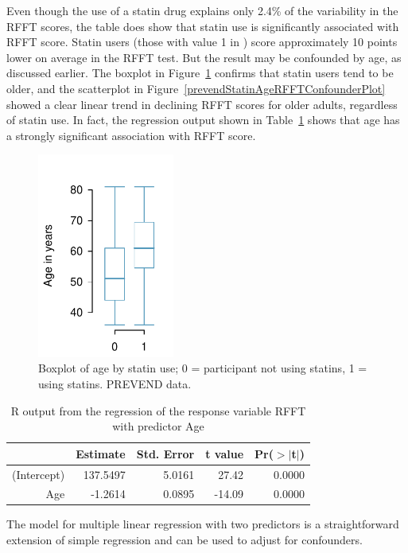 Even though the use of a statin drug explains only 2.4\% of the variability in the RFFT scores, the table does show that statin use is significantly associated with RFFT score. Statin users (those with value 1 in ) score approximately 10 points lower on average in the RFFT test.  But the result may be confounded by age, as discussed earlier.   The boxplot in Figure~\ref{prevendStatinAgeBoxPlot} confirms that statin users tend to be older, and the scatterplot in Figure~\ref{prevendStatinAgeRFFTConfounderPlot} showed a clear linear trend in declining RFFT scores for older adults, regardless of statin use.  In fact, the regression output shown in Table~\ref{prevendRFFTAgeRegression} shows that age has a strongly significant association with RFFT score.
 
 \begin{figure}[h!]
 	\centering
 	\includegraphics[width=0.4\textwidth]
	{ch_multiple_linear_regression_oi_biostat/figures/prevendStatinAgeBoxPlot/prevendStatinAgeBoxPlot.pdf}
 	\caption{Boxplot of age by statin use; 0 = participant not using statins, 1 = using statins. PREVEND data.}
	\label{prevendStatinAgeBoxPlot}
 \end{figure}
 
\begin{table}[ht]
\centering
\begin{tabular}{rrrrr}
  \hline
 & Estimate & Std. Error & t value & Pr($>$$|$t$|$) \\ 
  \hline
(Intercept) & 137.5497 & 5.0161 & 27.42 & 0.0000 \\ 
  Age & -1.2614 & 0.0895 & -14.09 & 0.0000 \\ 
   \hline
\end{tabular}
\caption{R output from the regression of the 
       response variable RFFT with predictor Age} 
\label{prevendRFFTAgeRegression}
\end{table}
The model for multiple linear regression with two predictors is a straightforward extension of simple regression and can be used to adjust for confounders.  

